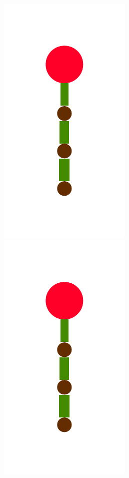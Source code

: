 \documentclass[a4paper,10pt]{article}
\begin{document}
\begin{figure}
{    \includegraphics[scale=.2]{../figures/vector/4-2-3-recursion-post-3.pdf}
    \includegraphics[scale=.2]{../figures/vector/4-2-3-recursion-post-4.pdf}
}
\end{figure}
\end{document}

